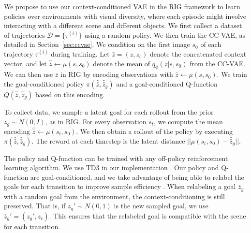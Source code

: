 
We propose to use our context-conditioned VAE in the RIG framework to learn policies over environments with visual diversity, where each episode might involve interacting with a different scene and different objects.
We first collect a dataset of trajectories $\mathcal D = \{\tau^{(i)}\}$ using a random policy. We then train the CC-VAE, as detailed in Section~\ref{sec:ccvae}. We condition on the first image $s_0$ of each trajectory $\tau^{(i)}$ during training.
Let $\bar{z} = (z, z_c)$ denote the concatenated context vector,
and let $\hat{\bar{z}} \leftarrow \mu(s, s_0)$ denote the mean of $q_\phi(z|s, s_0)$ from the CC-VAE. We can then use $\bar{z}$ in RIG by encoding observations with \mbox{$\hat{z} \leftarrow \mu(s, s_0)$}.
We train the goal-conditioned policy $\pi(\hat{\bar{z}}, \hat{\bar{z}}_g)$ and a goal-conditioned Q-function $Q(\hat{\bar{z}}, \hat{\bar{z}}_g)$ based on this encoding.

To collect data, we sample a latent goal for each rollout from the prior $z_g \sim N(0, I)$, as in RIG. For every observation $s_t$, we compute the mean encoding $\hat{\bar{z}} \leftarrow \mu(s_t, s_0)$. We then obtain a rollout of the policy by executing $\pi(\hat{\bar{z}}, \hat{\bar{z}}_g)$. The reward at each timestep is the latent distance $|| \mu(s_t, s_0) - \hat{\bar{z}}_g||$.

The policy and Q-function can be trained with any off-policy reinforcement learning algorithm. We use TD3 in our implementation \cite{fujimoto2018td3}. Our policy and Q-function are goal-conditioned, and we take advantage of being able to relabel the goals for each transition to improve sample efficiency \cite{andrychowicz2017her, nair2018rig, pong2019skewfit}. When relabeling a goal $\bar{z}_g$ with a random goal from the environment, the context-conditioning is still preserved. That is, if $z_g' \sim N(0, 1)$ is the new sampled goal, we use $\bar{z}_g' = (z_g', z_c)$. This ensures that the relabeled goal is compatible with the scene for each transition.

